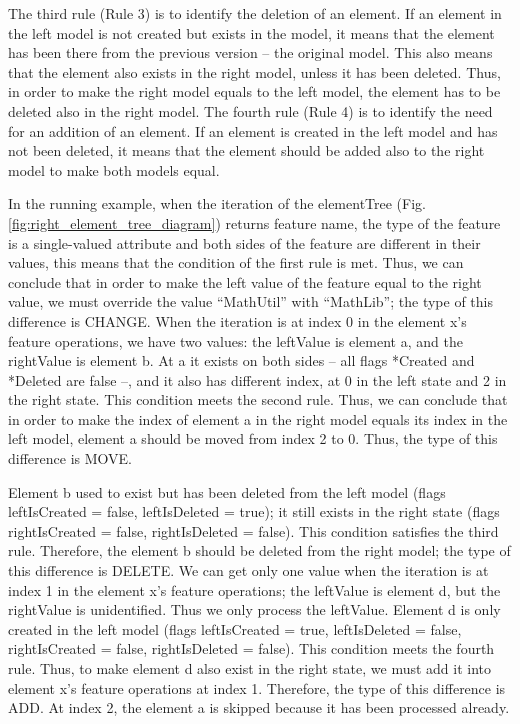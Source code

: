 \documentclass{jot}
\begin{document}
The third rule (Rule 3) is to identify the deletion of an element. If an element in the left model is not created but exists in the model, it means that the element has been there from the previous version -- the original model. This also means that the element also exists in the right model, unless it has been deleted. Thus, in order to make the right model equals to the left model, the element has to be deleted also in the right model. The fourth rule (Rule 4) is to identify the need for an addition of an element. If an element is created in the left model and has not been deleted, it means that the element should be added also to the right model to make both models equal.

In the running example, when the iteration of the \textsf{elementTree} (Fig. \ref{fig:right_element_tree_diagram}) returns feature \textsf{name}, the type of the feature is a single-valued attribute and both sides of the feature are different in their values, this means that the condition of the first rule is met. Thus, we can conclude that in order to make the left value of the feature equal to the right value, we must override the value ``MathUtil'' with ``MathLib''; the type of this difference is \textsf{CHANGE}. When the iteration is at index 0 in the element \textsf{x}'s feature \textsf{operations}, we have two values: the \textsf{leftValue} is element \textsf{a}, and the \textsf{rightValue} is element \textsf{b}. At \textsf{a} it exists on both sides -- all flags \textsf{*Created} and \textsf{*Deleted} are false --, and it also has different index, at 0 in the left state and 2 in the right state. This condition meets the second rule. Thus, we can conclude that in order to make the index of element \textsf{a} in the right model equals its index in the left model, element \textsf{a} should be moved from index 2 to 0. Thus, the type of this difference is \textsf{MOVE}. 

Element \textsf{b} used to exist but has been deleted from the left model (flags \textsf{leftIsCreated} = false, \textsf{leftIsDeleted} = true); it still exists in the right state (flags \textsf{rightIsCreated} = false, \textsf{rightIsDeleted} = false). This condition satisfies the third rule. Therefore, the element \textsf{b} should be deleted from the right model; the type of this difference is \textsf{DELETE}. We can get only one value when the iteration is at index 1 in the element \textsf{x}'s feature \textsf{operations}; the \textsf{leftValue} is element \textsf{d}, but the \textsf{rightValue} is unidentified. Thus we only process the \textsf{leftValue}. Element \textsf{d} is only created in the left model (flags \textsf{leftIsCreated} = true, \textsf{leftIsDeleted} = false, \textsf{rightIsCreated} = false, \textsf{rightIsDeleted} = false). This condition meets the fourth rule. Thus, to make element \textsf{d} also exist in the right state, we must add it into element \textsf{x}'s feature \textsf{operations} at index 1. Therefore, the type of this difference is \textsf{ADD}. At index 2, the element \textsf{a} is skipped because it has been processed already. 
\end{document}
